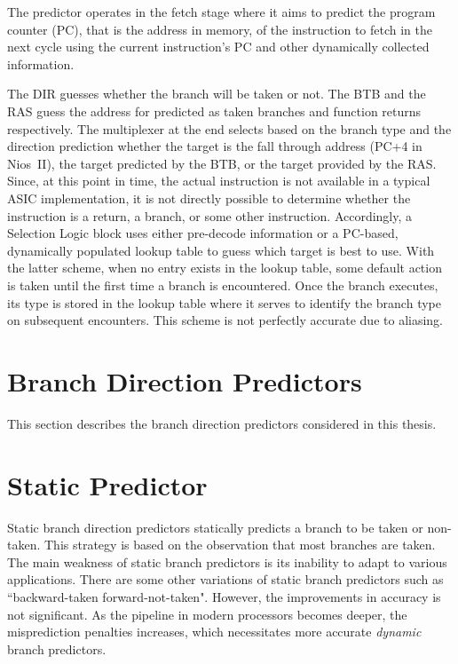 The predictor operates in the fetch stage where it aims to predict the program counter (PC), that is the address in memory, of the instruction to fetch in the next cycle using the current instruction's PC and other dynamically collected information. 

The DIR guesses whether the branch will be taken or not. The BTB and the RAS guess the address for  predicted as taken branches and function returns respectively. The multiplexer at the end selects based on the branch type and the direction prediction whether the target is the fall through address (PC+4 in Nios~II), the target predicted by the BTB, or the target provided by the RAS. Since, at this point in time, the actual instruction is not available in a typical ASIC implementation, it is not directly possible to determine whether the instruction is a return, a branch, or some other instruction. Accordingly, a Selection Logic block uses either pre-decode information or a PC-based, dynamically populated lookup table to guess which target is best to use. With the latter scheme, when no entry exists in the lookup table, some default action is taken until the first time a branch is encountered. Once the branch executes, its type is stored in the lookup table where it serves to identify the branch type on subsequent encounters. This scheme is not perfectly accurate due to aliasing.

\section{Branch Direction Predictors}
\label{sec:background:dirpred}
This section describes the branch direction predictors considered in this thesis.

\section{Static Predictor}
\label{sec:background:dirpred:static}
Static branch direction predictors statically predicts a branch to be taken or non-taken. This strategy is based on the observation that most branches are taken. The main weakness of static branch predictors is its inability to adapt to various applications. There are some other variations of static branch predictors such as ``backward-taken forward-not-taken". However, the improvements in accuracy is not significant. As the pipeline in modern processors becomes deeper, the misprediction penalties increases, which necessitates more accurate \textit{dynamic} branch predictors.

